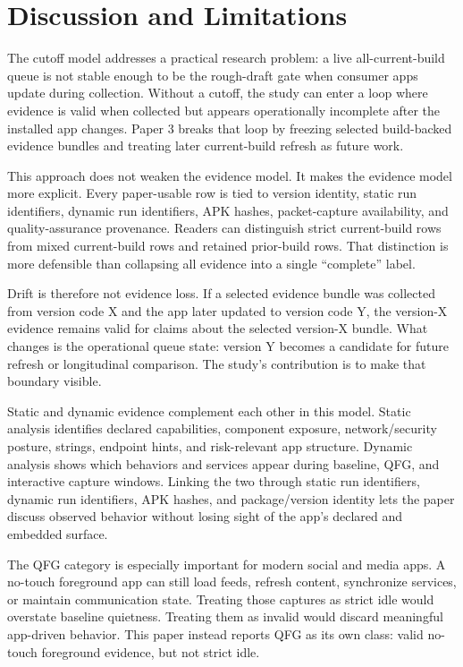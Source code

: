 \section{Discussion and Limitations}

The cutoff model addresses a practical research problem: a live all-current-build queue is not stable enough to be the rough-draft gate when consumer apps update during collection. Without a cutoff, the study can enter a loop where evidence is valid when collected but appears operationally incomplete after the installed app changes. Paper 3 breaks that loop by freezing selected build-backed evidence bundles and treating later current-build refresh as future work.

This approach does not weaken the evidence model. It makes the evidence model more explicit. Every paper-usable row is tied to version identity, static run identifiers, dynamic run identifiers, APK hashes, packet-capture availability, and quality-assurance provenance. Readers can distinguish strict current-build rows from mixed current-build rows and retained prior-build rows. That distinction is more defensible than collapsing all evidence into a single ``complete'' label.

Drift is therefore not evidence loss. If a selected evidence bundle was collected from version code X and the app later updated to version code Y, the version-X evidence remains valid for claims about the selected version-X bundle. What changes is the operational queue state: version Y becomes a candidate for future refresh or longitudinal comparison. The study's contribution is to make that boundary visible.

Static and dynamic evidence complement each other in this model. Static analysis identifies declared capabilities, component exposure, network/security posture, strings, endpoint hints, and risk-relevant app structure. Dynamic analysis shows which behaviors and services appear during baseline, QFG, and interactive capture windows. Linking the two through static run identifiers, dynamic run identifiers, APK hashes, and package/version identity lets the paper discuss observed behavior without losing sight of the app's declared and embedded surface.

The QFG category is especially important for modern social and media apps. A no-touch foreground app can still load feeds, refresh content, synchronize services, or maintain communication state. Treating those captures as strict idle would overstate baseline quietness. Treating them as invalid would discard meaningful app-driven behavior. This paper instead reports QFG as its own class: valid no-touch foreground evidence, but not strict idle.

